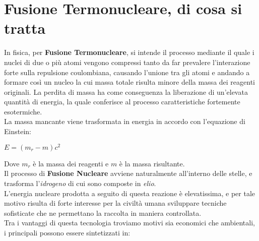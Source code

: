 \section*{Fusione Termonucleare, di cosa si tratta}
In fisica, per \textbf{Fusione Termonucleare}, si intende il processo mediante il quale i nuclei di due o più atomi vengono compressi tanto da far prevalere l’interazione forte sulla repulsione coulombiana, causando l'unione tra gli atomi e andando a formare così un nucleo la cui massa totale risulta minore della massa dei reagenti originali. La perdita di massa ha come conseguenza la liberazione di un’elevata quantità di energia, la quale conferisce al processo caratteristiche fortemente esotermiche.\\
La massa mancante viene trasformata in energia in accordo con l’equazione di Einstein:
\begin{center}
	$E = (m_r - m)c^2$
\end{center}
Dove $ m_r $ è la massa dei reagenti e $ m $ è la massa risultante.\\
Il processo di \textbf{Fusione Nucleare} avviene naturalmente all'interno delle stelle, e trasforma l'\textit{idrogeno} di cui sono composte in \textit{elio}.\\
L'energia nucleare prodotta a seguito di questa reazione è elevatissima, e per tale motivo risulta di forte interesse per la civiltà umana sviluppare tecniche sofisticate che ne permettano la raccolta in maniera controllata.\\
Tra i vantaggi di questa tecnologia troviamo motivi sia economici che ambientali, i principali possono essere sintetizzati in:
